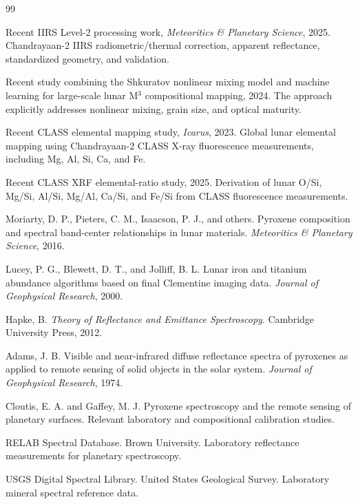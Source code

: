 \documentclass[11pt,a4paper]{article}
\begin{document}
\begin{thebibliography}{99}

Recent IIRS Level-2 processing work,
\emph{Meteoritics \& Planetary Science},
2025.
Chandrayaan-2 IIRS radiometric/thermal correction, apparent reflectance,
standardized geometry, and validation.

Recent study combining the Shkuratov nonlinear mixing model and machine
learning for large-scale lunar M$^3$ compositional mapping,
2024.
The approach explicitly addresses nonlinear mixing, grain size, and optical
maturity.

Recent CLASS elemental mapping study,
\emph{Icarus},
2023.
Global lunar elemental mapping using Chandrayaan-2 CLASS X-ray fluorescence
measurements, including Mg, Al, Si, Ca, and Fe.

Recent CLASS XRF elemental-ratio study,
2025.
Derivation of lunar O/Si, Mg/Si, Al/Si, Mg/Al, Ca/Si, and Fe/Si from CLASS
fluorescence measurements.

Moriarty, D. P., Pieters, C. M., Isaacson, P. J., and others.
Pyroxene composition and spectral band-center relationships in lunar
materials.
\emph{Meteoritics \& Planetary Science},
2016.

Lucey, P. G., Blewett, D. T., and Jolliff, B. L.
Lunar iron and titanium abundance algorithms based on final Clementine
imaging data.
\emph{Journal of Geophysical Research},
2000.

Hapke, B.
\emph{Theory of Reflectance and Emittance Spectroscopy}.
Cambridge University Press,
2012.

Adams, J. B.
Visible and near-infrared diffuse reflectance spectra of pyroxenes as
applied to remote sensing of solid objects in the solar system.
\emph{Journal of Geophysical Research},
1974.

Cloutis, E. A. and Gaffey, M. J.
Pyroxene spectroscopy and the remote sensing of planetary surfaces.
Relevant laboratory and compositional calibration studies.

RELAB Spectral Database.
Brown University.
Laboratory reflectance measurements for planetary spectroscopy.

USGS Digital Spectral Library.
United States Geological Survey.
Laboratory mineral spectral reference data.

\end{thebibliography}
\end{document}
